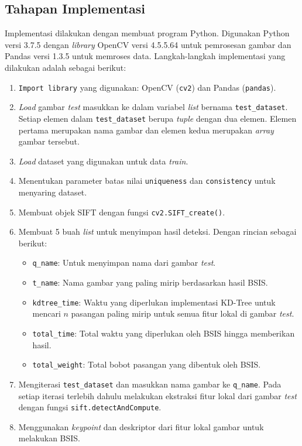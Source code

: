 \subsection{Tahapan Implementasi}
Implementasi dilakukan dengan membuat program Python. Digunakan Python versi 3.7.5 dengan \textit{library} OpenCV versi 4.5.5.64 untuk pemrosesan gambar dan Pandas versi 1.3.5 untuk memroses data. Langkah-langkah implementasi yang dilakukan adalah sebagai berikut:
\begin{enumerate}
	\item \texttt{Import library} yang digunakan: OpenCV (\texttt{cv2}) dan Pandas (\texttt{pandas}).
	\item \textit{Load} gambar \textit{test} masukkan ke dalam variabel \textit{list} bernama \texttt{test\_dataset}. Setiap elemen dalam \texttt{test\_dataset} berupa \textit{tuple} dengan dua elemen. Elemen pertama merupakan nama gambar dan elemen kedua merupakan \textit{array} gambar tersebut.
	\item \textit{Load} dataset yang digunakan untuk data \textit{train}.
	\item Menentukan parameter batas nilai \texttt{uniqueness} dan \texttt{consistency} untuk menyaring dataset. 
	\item Membuat objek SIFT dengan fungsi \texttt{cv2.SIFT\_create()}.
	\item Membuat 5 buah \textit{list} untuk menyimpan hasil deteksi. Dengan rincian sebagai berikut:
	\begin{itemize}
		\item \texttt{q\_name}: Untuk menyimpan nama dari gambar \textit{test}.
		\item \texttt{t\_name}: Nama gambar yang paling mirip berdasarkan hasil BSIS.
		\item \texttt{kdtree\_time}: Waktu yang diperlukan implementasi KD-Tree untuk mencari $n$ pasangan paling mirip untuk semua fitur lokal di gambar \textit{test}.
		\item \texttt{total\_time}: Total waktu yang diperlukan oleh BSIS hingga memberikan hasil.
		\item \texttt{total\_weight}: Total bobot pasangan yang dibentuk oleh BSIS.
	\end{itemize}
	\item Mengiterasi \texttt{test\_dataset} dan masukkan nama gambar ke \texttt{q\_name}. Pada setiap iterasi terlebih dahulu melakukan ekstraksi fitur lokal dari gambar \textit{test} dengan fungsi \texttt{sift.detectAndCompute}. 
	\item Menggunakan \textit{keypoint} dan deskriptor dari fitur lokal gambar untuk melakukan BSIS.

\end{enumerate}
